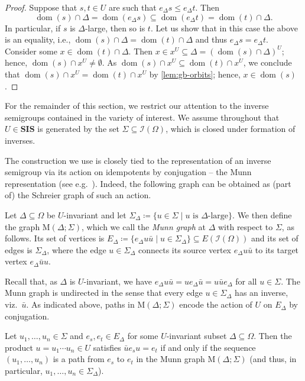 \documentclass[anonymous,letter,UKenglish,cleveref,autoref,thm-restate]{lipics-v2021}
\renewcommand{\leq}{\leqslant}
\newcommand{\eg}{e.g.~}
\newcommand{\sse}{\subseteq}
\newcommand{\dom}{\operatorname{dom}}
\newcommand{\vSI}{\ensuremath{\mathbf{SIS}}}
\newcommand{\ISym}{\cI}
\newcommand{\cI}{\mathcal{I}}
\theoremstyle{plain}
\theoremstyle{plain}
\begin{document}
\begin{proof}
  Suppose that $s,t \in U$ are such that $e_\Delta s \leq e_\Delta t$.
  Then \[
    \dom(s) \cap \Delta = \dom(e_\Delta s) \sse \dom(e_\Delta t) = \dom(t) \cap \Delta.
  \]
  In particular, if $s$ is $\Delta$-large, then so is $t$.
  Let us show that in this case the above is an equality, i.e., $\dom(s) \cap \Delta = \dom(t) \cap \Delta$ and thus $e_\Delta s = e_\Delta t$.
  Consider some $x \in \dom(t) \cap \Delta$.
  Then $x \in x^U \sse \Delta = (\dom(s) \cap \Delta)^U$; hence, $\dom(s) \cap x^U \neq \emptyset$.
  As $\dom(s) \cap x^U \sse \dom(t) \cap x^U$, we conclude that $\dom(s) \cap x^U = \dom(t) \cap x^U$ by \cref{lem:gb-orbits}; hence, $x \in \dom(s)$. 
\end{proof}

For the remainder of this section, we restrict our attention to the inverse semigroups contained in the variety of interest.
We assume throughout that $U \in \vSI$ is generated by the set $\Sigma \sse \ISym(\Omega)$, which is closed under formation of inverses.

The construction we use is closely tied to the representation of an inverse semigroup via its action on idempotents by conjugation -- the Munn representation (see \eg \cite{Petrich84,Law99}).
Indeed, the following graph can be obtained as (part of) the Schreier graph of such an action.


\begin{definition}\label{def:gb-munn}
  Let $\Delta \sse \Omega$ be $U$-invariant and let $\Sigma_\Delta \coloneqq \{ u \in \Sigma \mid u \text{ is $\Delta$-large} \}$.
  We then define the graph $\mathrm{M}(\Delta; \Sigma)$, which we call the \emph{Munn graph} at $\Delta$ with respect to $\Sigma$, as follows.
  Its set of vertices is $E_\Delta \coloneqq \{e_\Delta u\bar u \mid u \in \Sigma_\Delta\} \sse E(\ISym(\Omega))$ and its set of edges is $\Sigma_\Delta$, where the edge $u \in \Sigma_\Delta$ connects its source vertex $e_\Delta u\bar u$ to its target vertex $e_\Delta \bar uu$.
\end{definition}

Recall that, as $\Delta$ is $U$-invariant, we have $e_\Delta u\bar u = ue_\Delta \bar u = u\bar u e_\Delta$ for all $u \in \Sigma$.
The Munn graph is undirected in the sense that every edge $u \in \Sigma_\Delta$ has an inverse, viz.\ $\bar u$.
As indicated above, paths in $\mathrm{M}(\Delta; \Sigma)$ encode the action of $U$ on $E_\Delta$ by conjugation.

\begin{lemma}\label{lem:gb-munn-paths}
  Let $u_1, \dotsc, u_n \in \Sigma$ and $e_s,e_t \in E_\Delta$ for some $U$-invariant subset $\Delta \sse \Omega$.
  Then the product $u = u_1 \cdots u_n \in U$ satisfies $\bar u e_s u = e_t$ if and only if the sequence $(u_1, \dotsc, u_n)$ is a path from $e_s$ to $e_t$ in the Munn graph $\mathrm{M}(\Delta; \Sigma)$ (and thus, in particular, $u_1, \dotsc, u_n \in \Sigma_\Delta$).
\end{lemma}
\end{document}
